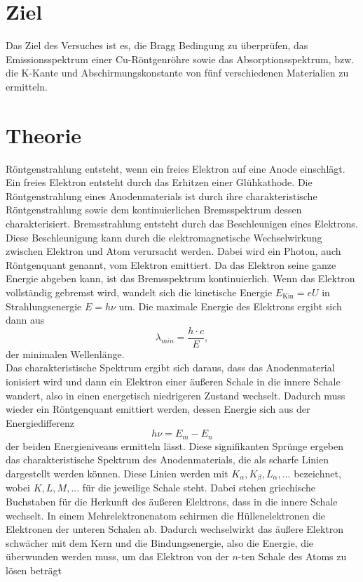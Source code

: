 \section{Ziel}
Das Ziel des Versuches ist es, die Bragg Bedingung zu überprüfen, das Emissionsspektrum einer Cu-Röntgenröhre sowie das Absorptionsspektrum, bzw. die K-Kante und Abschirmungskonstante von fünf verschiedenen Materialien zu ermitteln.

\section{Theorie}
Röntgenstrahlung entsteht, wenn ein freies Elektron auf eine Anode einschlägt. Ein freies Elektron entsteht durch das Erhitzen einer Glühkathode. Die Röntgenstrahlung eines Anodenmaterials ist durch ihre charakteristische Röntgenstrahlung sowie dem kontinuierlichen Bremsspektrum dessen charakterisiert. Bremsstrahlung entsteht durch das Beschleunigen eines Elektrons. Diese Beschleunigung kann durch die elektromagnetische Wechselwirkung zwischen Elektron und Atom verursacht werden. Dabei wird ein Photon, auch Röntgenquant genannt, vom Elektron emittiert. Da das Elektron seine ganze Energie abgeben kann, ist das Bremsspektrum kontinuierlich. Wenn das Elektron vollständig gebremst wird, wandelt sich die kinetische Energie $E_{\textrm{Kin}}=eU$ in Strahlungsenergie $E=h\nu$ um. Die maximale Energie des Elektrons ergibt sich dann aus 
\begin{equation}
  \lambda_{min}=\frac{h\cdot c}{E},
  \label{1}
\end{equation}
der minimalen Wellenlänge.\\
Das charakteristische Spektrum ergibt sich daraus, dass das Anodenmaterial ionisiert wird und dann ein Elektron einer äußeren Schale in die innere Schale wandert, also in einen energetisch niedrigeren Zustand wechselt. Dadurch muss wieder ein Röntgenquant emittiert werden, dessen Energie sich aus der Energiedifferenz 
\begin{equation}
  h\nu=E_{m}-E_{n}
  \label{2}
\end{equation}
der beiden Energieniveaus ermitteln lässt. Diese signifikanten Sprünge ergeben das charakteristische Spektrum des Anodenmaterials, die als scharfe Linien dargestellt werden können. Diese Linien werden mit $K_{\alpha}, K_{\beta}, L_{\alpha}, ...$ bezeichnet, wobei $K,L,M,...$ für die jeweilige Schale steht. Dabei stehen griechische Buchstaben für die Herkunft des äußeren Elektrons, dass in die innere Schale wechselt. In einem Mehrelektronenatom schirmen die Hüllenelektronen die Elektronen der unteren Schalen ab. Dadurch wechselwirkt das äußere Elektron schwächer mit dem Kern und die Bindungsenergie, also die Energie, die überwunden werden muss, um das Elektron von der $n$-ten Schale des Atoms zu lösen beträgt
